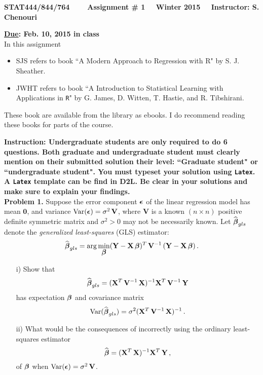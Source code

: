 \documentclass[12pt]{report}
\newcommand{\bfmath}[1]{\mbox{\boldmath$#1$\unboldmath}}
\begin{document}
\begin{center}
{\bf STAT444/844/764 ~~~ Assignment \# 1 ~~Winter 2015 ~~Instructor: S. Chenouri}
\end{center}

\noindent
{\bf \underline {Due}: Feb. 10, 2015 in class}\\
In this assignment 
\begin{itemize}
\item SJS refers to book ``A Modern Approach to Regression with R" by S. J. Sheather. 
\item JWHT refers to book ``A Introduction to Statistical Learning with Applications in {\tt R}" by G. James, D. Witten, T. Hastie, and R. Tibshirani. 
\end{itemize}
These book are available from the library as ebooks. I do recommend reading these books for parts of the course.

\noindent
{\bf Instruction: Undergraduate students are only required to do 6 questions. Both graduate and undergraduate student must clearly mention on their submitted solution their level: ``Graduate student" or ``undergraduate student". You must typeset your solution using {\tt Latex}. A  {\tt Latex} template can be find in D2L. Be clear in your solutions and make sure to explain your findings.} \\

\vspace{1mm}
\noindent
{\bf Problem 1.} Suppose the error component $\bfmath{\epsilon}$ of the linear regression model has mean $\mathbf{0}$, and variance ${\rm Var}(\bfmath{\epsilon})=\sigma^2\,\mathbf{V}$, where $\mathbf{V}$ is a known $(n\times n)$ positive definite symmetric matrix and $\sigma^2>0$ may not be necessarily known. Let $\widehat{\bfmath{\beta}}_{gls}$ denote the {\it generalized least-squares} (GLS) estimator:
$$\widehat{\bfmath{\beta}}_{gls}=\arg\min\limits_{\bfmath{\beta}} (\mathbf{Y}-\mathbf{X}\,\bfmath{\beta})^T \,\mathbf{V}^{-1}\,(\mathbf{Y}-\mathbf{X}\,\bfmath{\beta})\,.$$  
\begin{itemize}
\item[i) ]
Show that 
$$\widehat{\bfmath{\beta}}_{gls}=(\mathbf{X}^T\,\mathbf{V}^{-1}\,\mathbf{X})^{-1}\mathbf{X}^T\,\mathbf{V}^{-1}\,\mathbf{Y}$$
has expectation $\bfmath{\beta}$ and covariance matrix $${\rm Var}(\widehat{\bfmath{\beta}}_{gls})=\sigma^2(\mathbf{X}^T\,\mathbf{V}^{-1}\,\mathbf{X})^{-1}\,.$$
\item[ii) ] What would be the consequences of incorrectly using the ordinary least-squares estimator $$\widehat{\bfmath{\beta}}=(\mathbf{X}^T\,\mathbf{X})^{-1}\mathbf{X}^T\,\mathbf{Y}\,,$$ of $\bfmath{\beta}$ when ${\rm Var}(\bfmath{\epsilon})=\sigma^2\,\mathbf{V}$.\\
\end{itemize}
\end{document}
